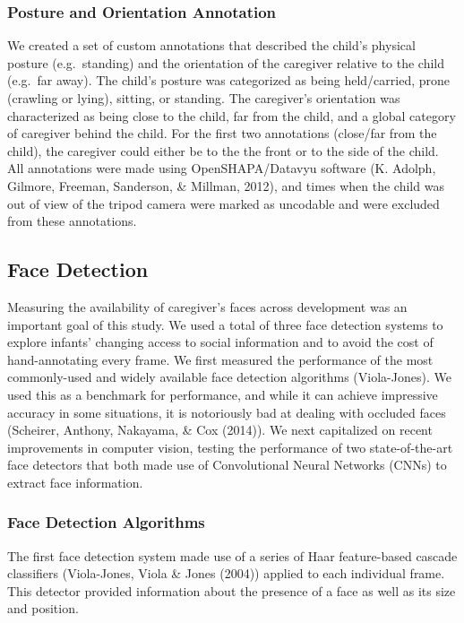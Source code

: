 \documentclass[10pt, letterpaper]{article}
\begin{document}
\subsubsection{Posture and Orientation
Annotation}\label{posture-and-orientation-annotation}

We created a set of custom annotations that described the child's
physical posture (e.g.~standing) and the orientation of the caregiver
relative to the child (e.g.~far away). The child's posture was
categorized as being held/carried, prone (crawling or lying), sitting,
or standing. The caregiver's orientation was characterized as being
close to the child, far from the child, and a global category of
caregiver behind the child. For the first two annotations (close/far
from the child), the caregiver could either be to the the front or to
the side of the child. All annotations were made using OpenSHAPA/Datavyu
software (K. Adolph, Gilmore, Freeman, Sanderson, \& Millman, 2012), and
times when the child was out of view of the tripod camera were marked as
uncodable and were excluded from these annotations.

\subsection{Face Detection}\label{face-detection}

Measuring the availability of caregiver's faces across development was
an important goal of this study. We used a total of three face detection
systems to explore infants' changing access to social information and to
avoid the cost of hand-annotating every frame. We first measured the
performance of the most commonly-used and widely available face
detection algorithms (Viola-Jones). We used this as a benchmark for
performance, and while it can achieve impressive accuracy in some
situations, it is notoriously bad at dealing with occluded faces
(Scheirer, Anthony, Nakayama, \& Cox (2014)). We next capitalized on
recent improvements in computer vision, testing the performance of two
state-of-the-art face detectors that both made use of Convolutional
Neural Networks (CNNs) to extract face information.

\subsubsection{Face Detection
Algorithms}\label{face-detection-algorithms}

The first face detection system made use of a series of Haar
feature-based cascade classifiers (Viola-Jones, Viola \& Jones (2004))
applied to each individual frame. This detector provided information
about the presence of a face as well as its size and position.
\end{document}
